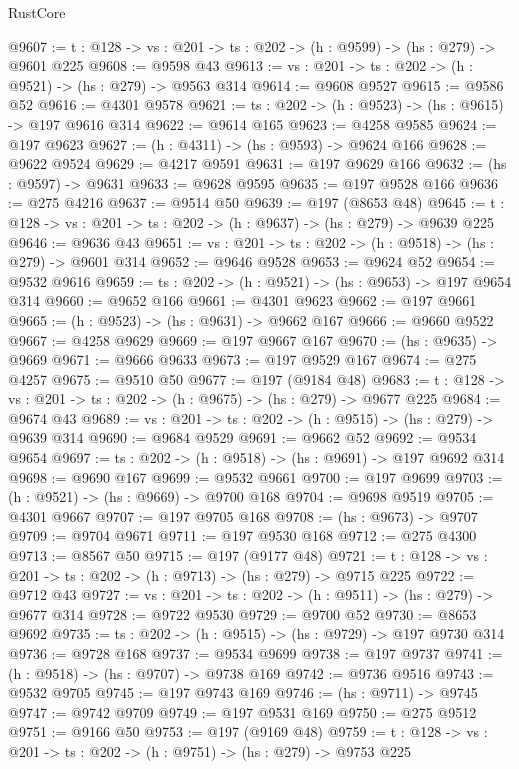 \begin{lexlean}{RustCore}
\begin{coremodule}
@9607 := {t : @128} -> {vs : @201} -> {ts : @202} -> (h : @9599) -> (hs : @279) -> @9601 @225
@9608 := @9598 @43
@9613 := {vs : @201} -> {ts : @202} -> (h : @9521) -> (hs : @279) -> @9563 @314
@9614 := @9608 @9527
@9615 := @9586 @52
@9616 := @4301 @9578
@9621 := {ts : @202} -> (h : @9523) -> (hs : @9615) -> @197 @9616 @314
@9622 := @9614 @165
@9623 := @4258 @9585
@9624 := @197 @9623
@9627 := (h : @4311) -> (hs : @9593) -> @9624 @166
@9628 := @9622 @9524
@9629 := @4217 @9591
@9631 := @197 @9629 @166
@9632 := (hs : @9597) -> @9631
@9633 := @9628 @9595
@9635 := @197 @9528 @166
@9636 := @275 @4216
@9637 := @9514 @50
@9639 := @197 (@8653 @48)
@9645 := {t : @128} -> {vs : @201} -> {ts : @202} -> (h : @9637) -> (hs : @279) -> @9639 @225
@9646 := @9636 @43
@9651 := {vs : @201} -> {ts : @202} -> (h : @9518) -> (hs : @279) -> @9601 @314
@9652 := @9646 @9528
@9653 := @9624 @52
@9654 := @9532 @9616
@9659 := {ts : @202} -> (h : @9521) -> (hs : @9653) -> @197 @9654 @314
@9660 := @9652 @166
@9661 := @4301 @9623
@9662 := @197 @9661
@9665 := (h : @9523) -> (hs : @9631) -> @9662 @167
@9666 := @9660 @9522
@9667 := @4258 @9629
@9669 := @197 @9667 @167
@9670 := (hs : @9635) -> @9669
@9671 := @9666 @9633
@9673 := @197 @9529 @167
@9674 := @275 @4257
@9675 := @9510 @50
@9677 := @197 (@9184 @48)
@9683 := {t : @128} -> {vs : @201} -> {ts : @202} -> (h : @9675) -> (hs : @279) -> @9677 @225
@9684 := @9674 @43
@9689 := {vs : @201} -> {ts : @202} -> (h : @9515) -> (hs : @279) -> @9639 @314
@9690 := @9684 @9529
@9691 := @9662 @52
@9692 := @9534 @9654
@9697 := {ts : @202} -> (h : @9518) -> (hs : @9691) -> @197 @9692 @314
@9698 := @9690 @167
@9699 := @9532 @9661
@9700 := @197 @9699
@9703 := (h : @9521) -> (hs : @9669) -> @9700 @168
@9704 := @9698 @9519
@9705 := @4301 @9667
@9707 := @197 @9705 @168
@9708 := (hs : @9673) -> @9707
@9709 := @9704 @9671
@9711 := @197 @9530 @168
@9712 := @275 @4300
@9713 := @8567 @50
@9715 := @197 (@9177 @48)
@9721 := {t : @128} -> {vs : @201} -> {ts : @202} -> (h : @9713) -> (hs : @279) -> @9715 @225
@9722 := @9712 @43
@9727 := {vs : @201} -> {ts : @202} -> (h : @9511) -> (hs : @279) -> @9677 @314
@9728 := @9722 @9530
@9729 := @9700 @52
@9730 := @8653 @9692
@9735 := {ts : @202} -> (h : @9515) -> (hs : @9729) -> @197 @9730 @314
@9736 := @9728 @168
@9737 := @9534 @9699
@9738 := @197 @9737
@9741 := (h : @9518) -> (hs : @9707) -> @9738 @169
@9742 := @9736 @9516
@9743 := @9532 @9705
@9745 := @197 @9743 @169
@9746 := (hs : @9711) -> @9745
@9747 := @9742 @9709
@9749 := @197 @9531 @169
@9750 := @275 @9512
@9751 := @9166 @50
@9753 := @197 (@9169 @48)
@9759 := {t : @128} -> {vs : @201} -> {ts : @202} -> (h : @9751) -> (hs : @279) -> @9753 @225

\end{coremodule}
\end{lexlean}
